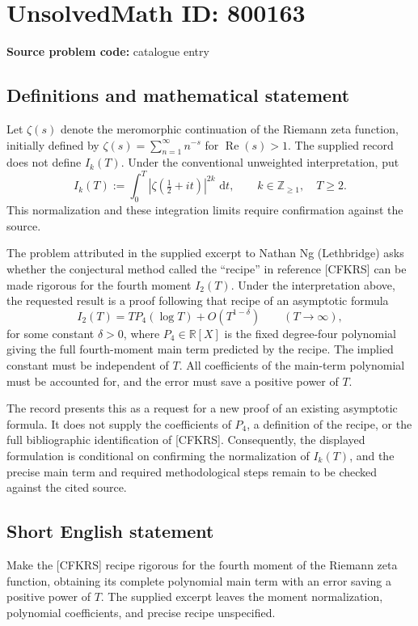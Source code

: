 \documentclass[11pt]{article}
\newcommand{\Z}{\mathbb{Z}}
\newcommand{\R}{\mathbb{R}}
\newcommand{\dd}{\,\mathrm{d}}
\begin{document}
\section*{UnsolvedMath ID: 800163}
\textbf{Source problem code:} catalogue entry
\subsection{Definitions and mathematical statement}
Let \(\zeta(s)\) denote the meromorphic continuation of the Riemann zeta function, initially defined by \(\zeta(s)=\sum_{n=1}^{\infty}n^{-s}\) for \(\operatorname{Re}(s)>1\). The supplied record does not define \(I_k(T)\). Under the conventional unweighted interpretation, put
\[
I_k(T):=\int_0^T\left|\zeta\!\left(\tfrac12+it\right)\right|^{2k}\,\dd t,
\qquad k\in\Z_{\geq1},\quad T\geq2.
\]
This normalization and these integration limits require confirmation against the source.

The problem attributed in the supplied excerpt to Nathan Ng (Lethbridge) asks whether the conjectural method called the ``recipe'' in reference [CFKRS] can be made rigorous for the fourth moment \(I_2(T)\). Under the interpretation above, the requested result is a proof following that recipe of an asymptotic formula
\[
I_2(T)=T P_4(\log T)+O\!\left(T^{1-\delta}\right)
\qquad (T\to\infty),
\]
for some constant \(\delta>0\), where \(P_4\in\R[X]\) is the fixed degree-four polynomial giving the full fourth-moment main term predicted by the recipe. The implied constant must be independent of \(T\). All coefficients of the main-term polynomial must be accounted for, and the error must save a positive power of \(T\).

The record presents this as a request for a new proof of an existing asymptotic formula. It does not supply the coefficients of \(P_4\), a definition of the recipe, or the full bibliographic identification of [CFKRS]. Consequently, the displayed formulation is conditional on confirming the normalization of \(I_k(T)\), and the precise main term and required methodological steps remain to be checked against the cited source.
\subsection{Short English statement}
Make the [CFKRS] recipe rigorous for the fourth moment of the Riemann zeta function, obtaining its complete polynomial main term with an error saving a positive power of \(T\). The supplied excerpt leaves the moment normalization, polynomial coefficients, and precise recipe unspecified.
\end{document}

